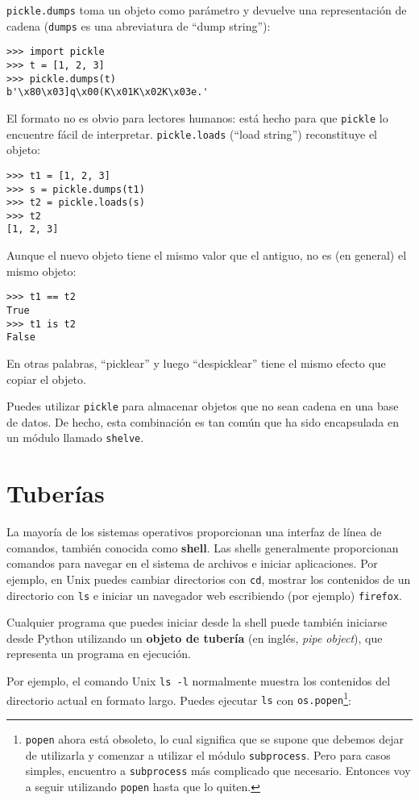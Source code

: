 \documentclass[10pt]{book}
\begin{document}
{\tt pickle.dumps} toma un objeto como parámetro y devuelve
una representación de cadena ({\tt dumps} es una abreviatura de ``dump string''):

\begin{verbatim}
>>> import pickle
>>> t = [1, 2, 3]
>>> pickle.dumps(t)
b'\x80\x03]q\x00(K\x01K\x02K\x03e.'
\end{verbatim}
%
El formato no es obvio para lectores humanos: está hecho para que
{\tt pickle} lo encuentre fácil de interpretar.  {\tt pickle.loads}
(``load string'') reconstituye el objeto:

\begin{verbatim}
>>> t1 = [1, 2, 3]
>>> s = pickle.dumps(t1)
>>> t2 = pickle.loads(s)
>>> t2
[1, 2, 3]
\end{verbatim}
%
Aunque el nuevo objeto tiene el mismo valor que el antiguo, no es
(en general) el mismo objeto:

\begin{verbatim}
>>> t1 == t2
True
>>> t1 is t2
False
\end{verbatim}
%
En otras palabras, ``picklear'' y luego ``despicklear'' tiene el mismo efecto
que copiar el objeto.

Puedes utilizar {\tt pickle} para almacenar objetos que no sean cadena en una base de datos.
De hecho, esta combinación es tan común que ha sido
encapsulada en un módulo llamado {\tt shelve}.


\section{Tuberías}

La mayoría de los sistemas operativos proporcionan una interfaz de línea de comandos,
también conocida como {\bf shell}.  Las shells generalmente proporcionan comandos
para navegar en el sistema de archivos e iniciar aplicaciones.  Por
ejemplo, en Unix puedes cambiar directorios con {\tt cd},
mostrar los contenidos de un directorio con {\tt ls} e iniciar
un navegador web escribiendo (por ejemplo) {\tt firefox}.

Cualquier programa que puedes iniciar desde la shell puede también
iniciarse desde Python utilizando un {\bf objeto de tubería} (en inglés, {\em pipe object}), que
representa un programa en ejecución.

Por ejemplo, el comando Unix {\tt ls -l} normalmente muestra los
contenidos del directorio actual en formato largo.  Puedes
ejecutar {\tt ls} con {\tt os.popen}\footnote{{\tt popen} ahora está
obsoleto, lo cual significa que se supone que debemos dejar de utilizarla y comenzar a utilizar
el módulo {\tt subprocess}.  Pero para casos simples, encuentro a
{\tt subprocess} más complicado que necesario.  Entonces voy a
seguir utilizando {\tt popen} hasta que lo quiten.}:
\end{document}
